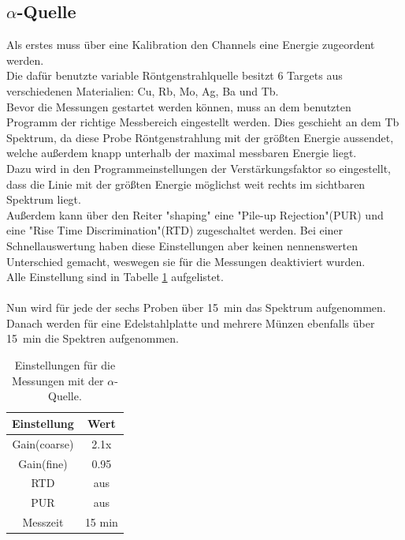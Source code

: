 \documentclass[12pt,a4paper]{article}
\begin{document}
\subsection{$\alpha$-Quelle}
Als erstes muss über eine Kalibration den Channels eine Energie zugeordent werden.\\
Die dafür benutzte variable Röntgenstrahlquelle besitzt 6 Targets aus verschiedenen Materialien: Cu, Rb, Mo, Ag, Ba und Tb.\\
Bevor die Messungen gestartet werden können, muss an dem benutzten Programm der richtige Messbereich eingestellt werden. Dies geschieht an dem Tb Spektrum, da diese Probe Röntgenstrahlung mit der größten Energie aussendet, welche außerdem knapp unterhalb der maximal messbaren Energie liegt.\\
Dazu wird in den Programmeinstellungen der Verstärkungsfaktor so eingestellt, dass die Linie mit der größten Energie möglichst weit rechts im sichtbaren Spektrum liegt.\\
Außerdem kann über den Reiter "shaping" eine "Pile-up Rejection"(PUR) und eine "Rise Time Discrimination"(RTD) zugeschaltet werden. Bei einer Schnellauswertung haben diese Einstellungen aber keinen nennenswerten Unterschied gemacht, weswegen sie für die Messungen deaktiviert wurden.\\
Alle Einstellung sind in Tabelle \ref{tab:alpha_Einstellungen} aufgelistet.\\
\\
Nun wird für jede der sechs Proben über \SI{15}{min} das Spektrum aufgenommen.\\
Danach werden für eine Edelstahlplatte und mehrere Münzen ebenfalls über \SI{15}{min} die Spektren aufgenommen.
\begin{table}
\centering
\begin{tabular}{|c|c|}
\hline 
Einstellung & Wert \\ 
\hline 
Gain(coarse) & 2.1x \\ 
\hline 
Gain(fine) & 0.95 \\ 
\hline 
RTD & aus \\ 
\hline 
PUR & aus \\ 
\hline 
Messzeit & 15 min \\ 
\hline 
\end{tabular} 
\caption{Einstellungen für die Messungen mit der $\alpha$-Quelle.}
\label{tab:alpha_Einstellungen}
\end{table}
\end{document}
